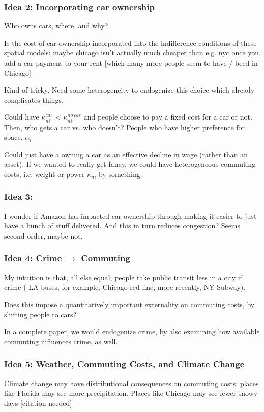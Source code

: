 \documentclass{article}
\begin{document}
\subsubsection{Idea 2: Incorporating car ownership}
Who owns cars, where, and why?

Is the cost of car ownership incorporated into the indifference conditions of these spatial models: maybe chicago isn't actually much cheaper than e.g. nyc once you add a car payment to your rent [which many more people seem to have / beed in Chicago] 


Kind of tricky. Need some heterogeneity to endogenize this choice which already complicates things.

Could have $\kappa^{car}_{ni}$ <
$\kappa^{no \ car}_{ni} $ and people choose to pay a fixed cost for a car or not. 
Then, who gets a car vs. who doesn't? 
People who have higher preference for space, $\alpha_i$

Could just have a owning a car as an effective decline in wage (rather than an asset).
If we wanted to really get fancy, we could have heterogeneous commuting costs, i.e. weight or power $\kappa_{ni}$ by something. 


\subsubsection{Idea 3: }
I wonder if Amazon has impacted car ownership through making it easier to just have a bunch of stuff delivered. 
And this in turn reduces congestion? Seems second-order, maybe not.

\subsubsection{Idea 4: Crime $\rightarrow$ Commuting}
My intuition is that, all else equal, people take public transit less in a city if crime ( LA buses, for example, Chicago red line, more recently, NY Subway).

Does this impose a quantitatively important externality on commuting costs, by shifting people to cars?

In a complete paper, we would endogenize crime, by also examining how available commuting influences crime, as well. 

\subsubsection{Idea 5: Weather, Commuting Costs, and Climate Change}
Climate change may have distributional consequences on commuting costs:
places like Florida may see more precipitation. Places like Chicago may see fewer snowy days [citation needed]
\end{document}
